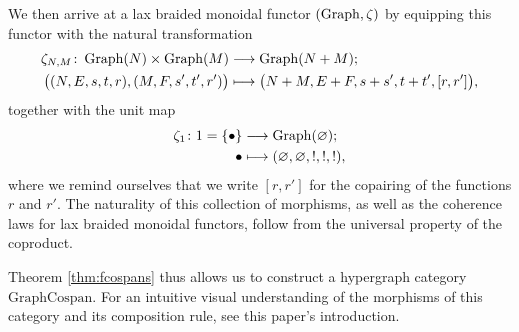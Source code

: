 We then arrive at a lax braided monoidal functor $(\operatorname{Graph},\zeta)$ by equipping
this functor with the natural transformation 
\begin{align*}
  \zeta_{N,M}\colon  \operatorname{Graph}(N) \times \operatorname{Graph}(M)
  &\longrightarrow \operatorname{Graph}(N+M); \\
  \big( (N,E,s,t,r), (M,F,s',t',r') \big) &\longmapsto
  \big(N+M,E+F,s+s',t+t',[r,r']\big),
\end{align*}
together with the unit map
\begin{align*}
  \zeta_1\colon  1=\{\bullet\} &\longrightarrow \operatorname{Graph}(\varnothing); \\
  \bullet &\longmapsto
  (\varnothing,\varnothing,!,!,!),
\end{align*}
where we remind ourselves
that we write $[r,r']$ for the copairing of the functions $r$ and $r'$. The
naturality of this collection of morphisms, as well as the coherence laws for
lax braided monoidal functors, follow from the universal property of the coproduct.

Theorem \ref{thm:fcospans} thus allows us to construct a hypergraph category
$\mathrm{GraphCospan}$.  For an intuitive visual understanding of the morphisms
of this category and its composition rule, see this paper's introduction.



